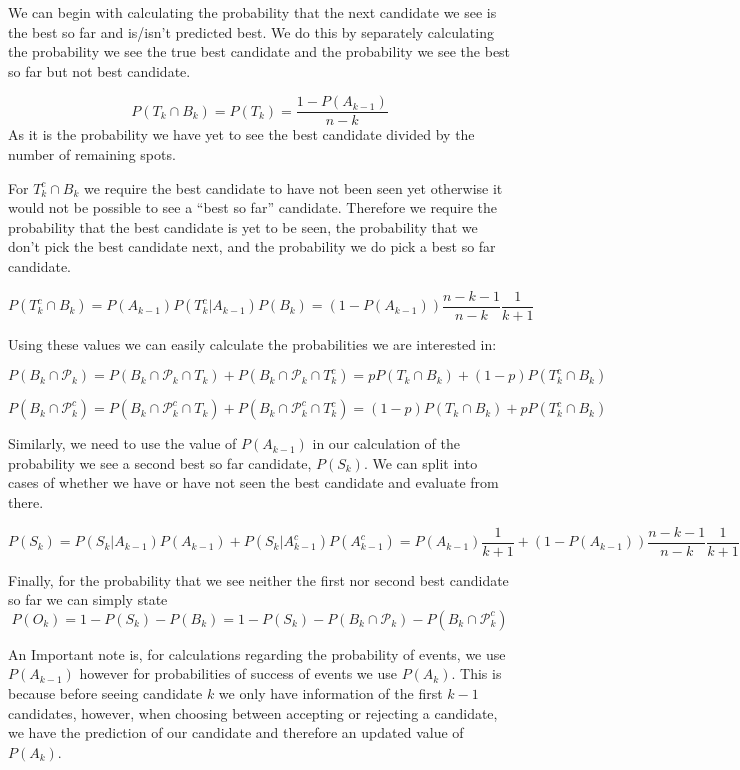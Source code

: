 \documentclass[a4paper,11pt]{article}
\begin{document}
We can begin with calculating the probability that the next candidate we see is the best so far and is/isn't predicted best. We do this by separately calculating the probability we see the true best candidate and the probability we see the best so far but not best candidate.

$$
P(T_k\cap B_k) = P(T_k) = \frac{1-P(A_{k-1})}{n-k}
$$
As it is the probability we have yet to see the best candidate divided by the number of remaining spots. 

For $T_k^c \cap B_k$ we require the best candidate to have not been seen yet otherwise it would not be possible to see a ``best so far'' candidate. Therefore we require the probability that the best candidate is yet to be seen, the probability that we don't pick the best candidate next, and the probability we do pick a best so far candidate. 

$$
P(T_k^c \cap B_k) = P(A_{k-1})P(T_k^c|A_{k-1})P(B_k) = (1-P(A_{k-1}))\frac{n-k-1}{n-k}\frac{1}{k+1}
$$

Using these values we can easily calculate the probabilities we are interested in:

$$
P(B_k \cap \mathcal{P}_k) = P(B_k \cap \mathcal{P}_k \cap T_k) + P(B_k \cap \mathcal{P}_k \cap T_k^c) = pP(T_k\cap B_k) + (1-p)P(T_k^c\cap B_k)
$$

$$
P(B_k \cap \mathcal{P}_k^c) = P(B_k \cap \mathcal{P}_k^c \cap T_k) + P(B_k \cap \mathcal{P}_k^c \cap T_k^c) = (1-p)P(T_k\cap B_k) + pP(T_k^c\cap B_k)
$$

Similarly, we need to use the value of $P(A_{k-1})$ in our calculation of the probability we see a second best so far candidate, $P(S_k)$. We can split into cases of whether we have or have not seen the best candidate and evaluate from there.

$$
P(S_k) = P(S_k|A_{k-1})P(A_{k-1})+P(S_k|A_{k-1}^c)P(A_{k-1}^c) =  P(A_{k-1})\frac{1}{k+1}+ (1-P(A_{k-1}))\frac{n-k-1}{n-k}\frac{1}{k+1}
$$

Finally, for the probability that we see neither the first nor second best candidate so far we can simply state
$$
P(O_k) = 1- P(S_k) - P(B_k) = 1 - P(S_k)-P(B_k \cap \mathcal{P}_k) - P(B_k \cap \mathcal{P}_k^c)
$$

An Important note is, for calculations regarding the probability of events, we use $P(A_{k-1})$ however for probabilities of success of events we use $P(A_k)$. This is because before seeing candidate $k$ we only have information of the first $k-1$ candidates, however, when choosing between accepting or rejecting a candidate, we have the prediction of our candidate and therefore an updated value of $P(A_k)$.
\end{document}
